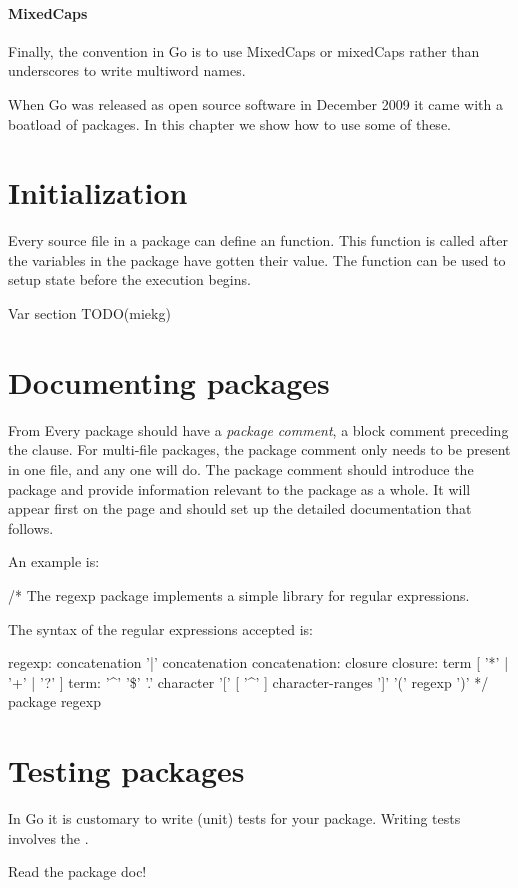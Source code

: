 \paragraph{MixedCaps}
Finally, the convention in Go is to use MixedCaps or mixedCaps rather
than underscores to write multiword names.

When Go was released as open source software in December 2009 it came
with a boatload of packages. In this chapter we show how to use some
of these.

\section{Initialization}
Every source file in a package can define an  function. This function is
called after the variables in the package have gotten their value. The
 function can be used to setup state before the execution
begins.

Var section TODO(miekg)

\section{Documenting packages}
From \cite{effective_go}
Every package should have a \emph{package comment}, a block comment preceding the
  clause. For multi-file packages, the package comment only needs to be
present in one file, and any one will do. The package comment should introduce
the package and provide information relevant to the package as a whole. It will
appear first on the  page and should set up the detailed documentation
that follows.

An example is:
\begin{display}
/*
    The regexp package implements a simple library for
    regular expressions.

    The syntax of the regular expressions accepted is:

    regexp:
        concatenation { '|' concatenation }
    concatenation:
        { closure }
    closure:
        term [ '*' | '+' | '?' ]
    term:
        '^'
        '\$'
        '.'
        character
        '[' [ '^' ] character-ranges ']'
        '(' regexp ')'
*/
package regexp
\end{display}





\section{Testing packages}
In Go it is customary to write (unit) tests for your package. Writing
tests involves the .
\begin{lbar}
Read the package doc!
\end{lbar}

